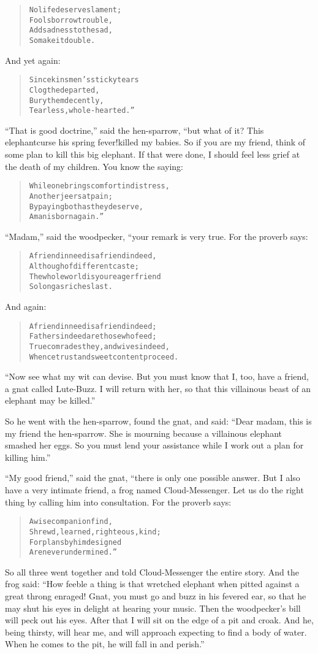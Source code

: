 \documentclass[article, twoside, 14pt]{memoir}
\renewenvironment{verbatim}{%
\begin{quote}%
\vskip -10pt%
\begin{alltt}\normalfont\large}{\end{alltt}%
\end{quote}%
\vskip -10pt
} %
\begin{document}
\begin{verbatim}
No life deserves lament;
    Fools borrow trouble,
Add sadness to the sad,
    So make it double.
\end{verbatim}
And yet again:

\begin{verbatim}
Since kinsmen's sticky tears
    Clog the departed,
Bury them decently,
    Tearless, whole-hearted.”
\end{verbatim}
``That is good doctrine,'' said the hen-sparrow, “but what of it?
This elephant{\textemdash}curse his spring fever!{\textemdash}killed my babies. So if
you are my friend, think of some plan to kill this big elephant. If
that were done, I should feel less grief at the death of my
children. You know the saying:

\begin{verbatim}
While one brings comfort in distress,
    Another jeers at pain;
By paying both as they deserve,
    A man is born again.”
\end{verbatim}
``Madam,'' said the woodpecker, “your remark is very true. For the
proverb says:

\begin{verbatim}
A friend in need is a friend indeed,
    Although of different caste;
The whole world is your eager friend
    So long as riches last.
\end{verbatim}
And again:

\begin{verbatim}
A friend in need is a friend indeed;
Fathers indeed are those who feed;
True comrades they, and wives indeed,
Whence trust and sweet content proceed.
\end{verbatim}
``Now see what my wit can devise. But you must know that I, too, have a friend, a gnat called Lute-Buzz. I will return with her, so that this villainous beast of an elephant may be killed.''

So he went with the hen-sparrow, found the gnat, and said:
``Dear madam, this is my friend the hen-sparrow. She is mourning because a villainous elephant smashed her eggs. So you must lend your assistance while I work out a plan for killing him.''

``My good friend,'' said the gnat, “there is only one possible
answer. But I also have a very intimate friend, a frog named
Cloud-Messenger. Let us do the right thing by calling him into
consultation. For the proverb says:

\begin{verbatim}
A wise companion find,
Shrewd, learned, righteous, kind;
For plans by him designed
Are never undermined.”
\end{verbatim}
So all three went together and told Cloud-Messenger the entire
story. And the frog said:
``How feeble a thing is that wretched elephant when pitted against a great throng enraged! Gnat, you must go and buzz in his fevered ear, so that he may shut his eyes in delight at hearing your music. Then the woodpecker's bill will peck out his eyes. After that I will sit on the edge of a pit and croak. And he, being thirsty, will hear me, and will approach expecting to find a body of water. When he comes to the pit, he will fall in and perish.''
\end{document}
